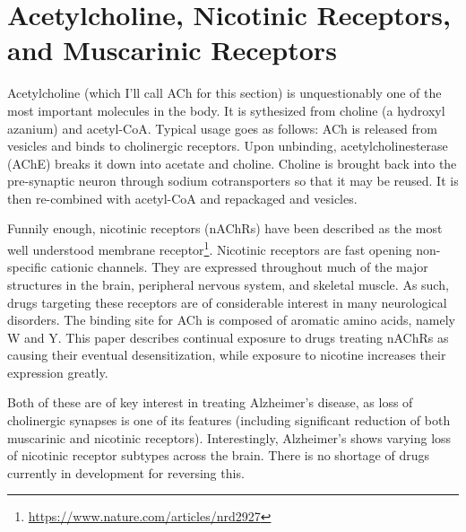 \documentclass[12pt]{report}
\begin{document}
\section{Acetylcholine, Nicotinic Receptors, and Muscarinic Receptors}

Acetylcholine (which I'll call ACh for this section) is unquestionably one of the most important molecules in the body. It is sythesized from choline (a hydroxyl azanium) and acetyl-CoA. Typical usage goes as follows: ACh is released from vesicles and binds to cholinergic receptors. Upon unbinding, acetylcholinesterase (AChE) breaks it down into acetate and choline. Choline is brought back into the pre-synaptic neuron through sodium cotransporters so that it may be reused. It is then re-combined with acetyl-CoA and repackaged and vesicles.\newline 

Funnily enough, nicotinic receptors (nAChRs) have been described as the most well understood membrane receptor\footnote{\url{https://www.nature.com/articles/nrd2927}}. Nicotinic receptors are fast opening non-specific cationic channels.  They are expressed throughout much of the major structures in the brain, peripheral nervous system, and skeletal muscle. As such, drugs targeting these receptors are of considerable interest in many neurological disorders. The binding site for ACh is composed of aromatic amino acids, namely W and Y. This paper describes continual exposure to drugs treating nAChRs as causing their eventual desensitization, while exposure to nicotine increases their expression greatly.\newline

Both of these are of key interest in treating Alzheimer's disease, as loss of cholinergic synapses is one of its features (including significant reduction of both muscarinic and nicotinic receptors). Interestingly, Alzheimer's shows varying loss of nicotinic receptor subtypes across the brain. There is no shortage of drugs currently in development for reversing this.\newline
\end{document}
